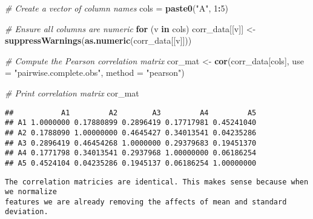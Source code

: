 \documentclass[
]{article}
\newenvironment{Shaded}{\begin{snugshade}}{\end{snugshade}}
\newcommand{\AttributeTok}[1]{\textcolor[rgb]{0.13,0.29,0.53}{#1}}
\newcommand{\CommentTok}[1]{\textcolor[rgb]{0.56,0.35,0.01}{\textit{#1}}}
\newcommand{\ControlFlowTok}[1]{\textcolor[rgb]{0.13,0.29,0.53}{\textbf{#1}}}
\newcommand{\DecValTok}[1]{\textcolor[rgb]{0.00,0.00,0.81}{#1}}
\newcommand{\FunctionTok}[1]{\textcolor[rgb]{0.13,0.29,0.53}{\textbf{#1}}}
\newcommand{\NormalTok}[1]{#1}
\newcommand{\OtherTok}[1]{\textcolor[rgb]{0.56,0.35,0.01}{#1}}
\newcommand{\SpecialCharTok}[1]{\textcolor[rgb]{0.81,0.36,0.00}{\textbf{#1}}}
\newcommand{\StringTok}[1]{\textcolor[rgb]{0.31,0.60,0.02}{#1}}
\begin{document}
\begin{Shaded}
\begin{Highlighting}[]
\CommentTok{\# Create a vector of column names}
\NormalTok{cols }\OtherTok{=} \FunctionTok{paste0}\NormalTok{(}\StringTok{"A"}\NormalTok{, }\DecValTok{1}\SpecialCharTok{:}\DecValTok{5}\NormalTok{)}

\CommentTok{\# Ensure all columns are numeric}
\ControlFlowTok{for}\NormalTok{ (v }\ControlFlowTok{in}\NormalTok{ cols) corr\_data[[v]] }\OtherTok{\textless{}{-}} \FunctionTok{suppressWarnings}\NormalTok{(}\FunctionTok{as.numeric}\NormalTok{(corr\_data[[v]]))}

\CommentTok{\# Compute the Pearson correlation matrix}
\NormalTok{cor\_mat }\OtherTok{\textless{}{-}} \FunctionTok{cor}\NormalTok{(corr\_data[cols], }\AttributeTok{use =} \StringTok{"pairwise.complete.obs"}\NormalTok{, }\AttributeTok{method =} \StringTok{"pearson"}\NormalTok{)}

\CommentTok{\# Print correlation matrix}
\NormalTok{cor\_mat}
\end{Highlighting}
\end{Shaded}

\begin{verbatim}
##           A1         A2        A3         A4         A5
## A1 1.0000000 0.17880899 0.2896419 0.17717981 0.45241040
## A2 0.1788090 1.00000000 0.4645427 0.34013541 0.04235286
## A3 0.2896419 0.46454268 1.0000000 0.29379683 0.19451370
## A4 0.1771798 0.34013541 0.2937968 1.00000000 0.06186254
## A5 0.4524104 0.04235286 0.1945137 0.06186254 1.00000000
\end{verbatim}

\begin{verbatim}
The correlation matricies are identical. This makes sense because when we normalize 
features we are already removing the affects of mean and standard deviation.
\end{verbatim}
\end{document}
